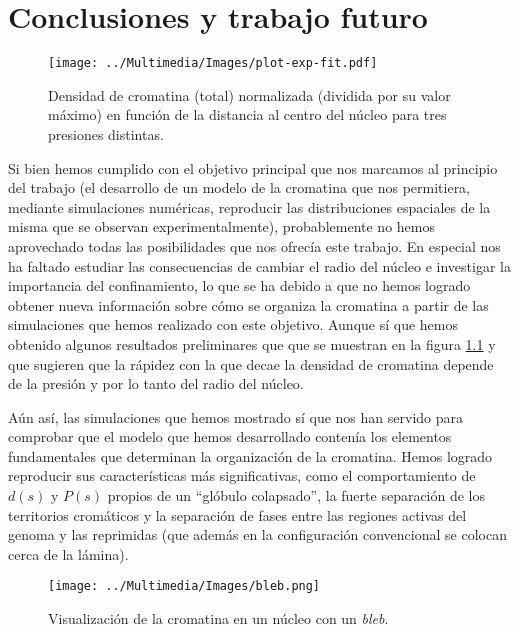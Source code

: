 \chapter{Conclusiones y trabajo futuro}
\label{cap:conclusions}

\begin{figure}[p]
    \centering
    \texttt{[image: ../Multimedia/Images/plot-exp-fit.pdf]}
    \caption{Densidad de cromatina (total) normalizada (dividida por su valor máximo) en función de la distancia al centro del núcleo para tres presiones distintas.}
    \label{fig:exp-fit}
\end{figure}

Si bien hemos cumplido con el objetivo principal que nos marcamos al principio del trabajo (el desarrollo de un modelo de la cromatina que nos permitiera, mediante simulaciones numéricas, reproducir las distribuciones espaciales de la misma que se observan experimentalmente), probablemente no hemos aprovechado todas las posibilidades que nos ofrecía este trabajo. En especial nos ha faltado estudiar las consecuencias de cambiar el radio del núcleo e investigar la importancia del confinamiento, lo que se ha debido a que no hemos logrado obtener nueva información sobre cómo se organiza la cromatina a partir de las simulaciones que hemos realizado con este objetivo. Aunque sí que hemos obtenido algunos resultados preliminares que que se muestran en la figura \ref{fig:exp-fit} y que sugieren que la rápidez con la que decae la densidad de cromatina depende de la presión y por lo tanto del radio del núcleo.

Aún así, las simulaciones que hemos mostrado sí que nos han servido para comprobar que el modelo que hemos desarrollado contenía los elementos fundamentales que determinan la organización de la cromatina. Hemos logrado reproducir sus características más significativas, como el comportamiento de $d(s)$ y $P(s)$ propios de un ``glóbulo colapsado'', la fuerte separación de los territorios cromáticos y la separación de fases entre las regiones activas del genoma y las reprimidas (que además en la configuración convencional se colocan cerca de la lámina).

\begin{figure}[p]
    \centering
    \texttt{[image: ../Multimedia/Images/bleb.png]}
    \caption{Visualización de la cromatina en un núcleo con un \textit{bleb}.}
    \label{fig:bleb}
\end{figure}

